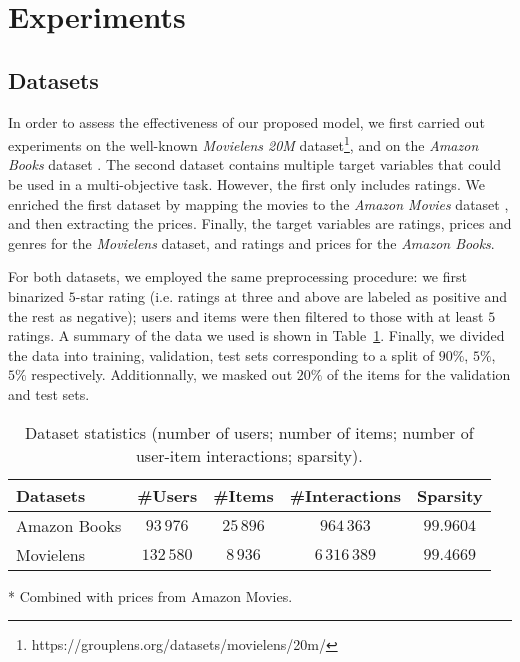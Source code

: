 \documentclass[letterpaper]{article}
\begin{document}
\section{Experiments}

\subsection{Datasets}

In order to assess the effectiveness of our proposed model, we first carried out experiments on the well-known \textit{Movielens 20M} dataset\footnote{https://grouplens.org/datasets/movielens/20m/}, and on the \textit{Amazon Books} dataset \cite{mcauley2013hidden}. The second dataset contains multiple target variables that could be used in a multi-objective task. However, the first only includes ratings. We enriched the first dataset by mapping the movies to the \textit{Amazon Movies} dataset \cite{mcauley2013hidden}, and then extracting the prices. Finally, the target variables are ratings, prices and genres for the \textit{Movielens} dataset, and ratings and prices for the \textit{Amazon Books}.

For both datasets, we employed the same preprocessing procedure: we first binarized $5$-star rating (i.e. ratings at three and above are labeled as positive and the rest as negative); users and items were then filtered to those with at least $5$ ratings. A summary of the data we used is shown in Table~\ref{table_data_desc}. Finally, we divided the data into training, validation, test sets corresponding to a split of $90\%$, $5\%$, $5\%$ respectively. Additionnally, we masked out $20\%$ of the items for the validation and test sets.

\begin{table}[!h]
\small
\begin{threeparttable}[t]
    \centering
\begin{tabular}{lcccc} 
Datasets & \#Users & \#Items & \#Interactions & Sparsity\\
\hline
Amazon Books & $93\,976$ & $25\,896$ & $964\,363$ & $99.9604$\\
Movielens\tnote{*} & $132\,580$ & $8\,936$ & $6\,316\,389$ & $99.4669$\\
\end{tabular}
\begin{tablenotes}
     \item[*]Combined with prices from Amazon Movies.
   \end{tablenotes}
\end{threeparttable}
\caption{Dataset statistics (number of users; number of items; number of user-item interactions; sparsity).}
\label{table_data_desc}
\end{table} 
\end{document}
